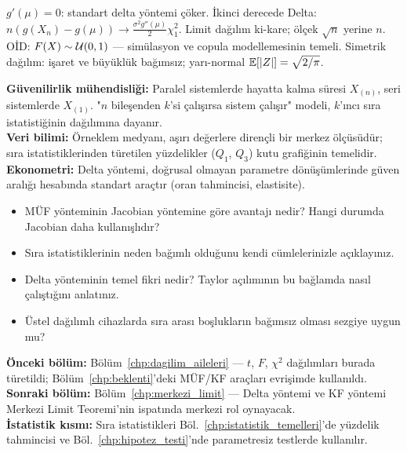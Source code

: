 \begin{mikroozet}
$g'(\mu) = 0$: standart delta yöntemi çöker.
İkinci derecede Delta: $n(g(X_n)-g(\mu)) \to \frac{\sigma^2 g''(\mu)}{2}\chi^2_1$.
Limit dağılım ki-kare; ölçek $\sqrt{n}$ yerine $n$.
OİD: $F(X)\sim\mathcal{U}(0,1)$ --- simülasyon ve copula modellemesinin temeli.
Simetrik dağılım: işaret ve büyüklük bağımsız; yarı-normal $\mathbb{E}[|Z|]=\sqrt{2/\pi}$.
\end{mikroozet}

\begin{kopru}
\textbf{Güvenilirlik mühendisliği:} Paralel sistemlerde hayatta kalma süresi $X_{(n)}$,
seri sistemlerde $X_{(1)}$. "$n$ bileşenden $k$'si çalışırsa sistem çalışır"
modeli, $k$'ıncı sıra istatistiğinin dağılımına dayanır.\\
\textbf{Veri bilimi:} Örneklem medyanı, aşırı değerlere dirençli bir merkez ölçüsüdür;
sıra istatistiklerinden türetilen yüzdelikler ($Q_1$, $Q_3$) kutu grafiğinin temelidir.\\
\textbf{Ekonometri:} Delta yöntemi, doğrusal olmayan parametre dönüşümlerinde
güven aralığı hesabında standart araçtır (oran tahmincisi, elastisite).
\end{kopru}

\begin{ozyansima}
\begin{itemize}
  \item MÜF yönteminin Jacobian yöntemine göre avantajı nedir? Hangi durumda
        Jacobian daha kullanışlıdır?
  \item Sıra istatistiklerinin neden bağımlı olduğunu kendi cümlelerinizle açıklayınız.
  \item Delta yönteminin temel fikri nedir? Taylor açılımının bu bağlamda nasıl çalıştığını anlatınız.
  \item Üstel dağılımlı cihazlarda sıra arası boşlukların bağımsız olması sezgiye uygun mu?
\end{itemize}
\end{ozyansima}

\begin{kopru}
\textbf{Önceki bölüm:} Bölüm~\ref{chp:dagilim_aileleri} --- $t$, $F$, $\chi^2$ dağılımları
burada türetildi; Bölüm~\ref{chp:beklenti}'deki MÜF/KF araçları evrişimde kullanıldı.\\
\textbf{Sonraki bölüm:} Bölüm~\ref{chp:merkezi_limit} --- Delta yöntemi ve KF
yöntemi Merkezi Limit Teoremi'nin ispatında merkezi rol oynayacak.\\
\textbf{İstatistik kısmı:} Sıra istatistikleri Böl.~\ref{chp:istatistik_temelleri}'de
yüzdelik tahmincisi ve Böl.~\ref{chp:hipotez_testi}'nde parametresiz testlerde kullanılır.
\end{kopru}

